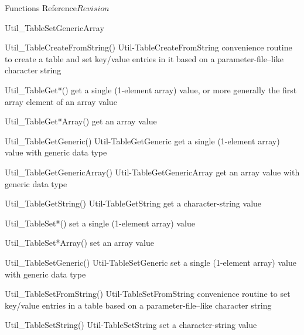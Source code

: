 \begin{cactuspart}{ Functions Reference}{}{$Revision$}
\begin{FunctionDescription}{Util\_TableSetGenericArray}
\begin{SeeAlsoSection}
\begin{SeeAlso2} {Util\_TableCreateFromString()} {Util-TableCreateFromString}
convenience routine to create a table and set key/value entries
in it based on a parameter-file--like character string
\end{SeeAlso2}
\begin{SeeAlso}{Util\_TableGet*()}
get a single (1-element array) value,
or more generally the first array element of an array value
\end{SeeAlso}
\begin{SeeAlso}{Util\_TableGet*Array()}
get an array value
\end{SeeAlso}
\begin{SeeAlso2} {Util\_TableGetGeneric()} {Util-TableGetGeneric}
get a single (1-element array) value with generic data type
\end{SeeAlso2}
\begin{SeeAlso2} {Util\_TableGetGenericArray()} {Util-TableGetGenericArray}
get an array value with generic data type
\end{SeeAlso2}
\begin{SeeAlso2} {Util\_TableGetString()} {Util-TableGetString}
get a character-string value
\end{SeeAlso2}
\begin{SeeAlso}{Util\_TableSet*()}
set a single (1-element array) value
\end{SeeAlso}
\begin{SeeAlso}{Util\_TableSet*Array()}
set an array value
\end{SeeAlso}
\begin{SeeAlso2} {Util\_TableSetGeneric()} {Util-TableSetGeneric}
set a single (1-element array) value with generic data type
\end{SeeAlso2}
\begin{SeeAlso2} {Util\_TableSetFromString()} {Util-TableSetFromString}
convenience routine to set key/value entries in a table based on a
parameter-file--like character string
\end{SeeAlso2}
\begin{SeeAlso2} {Util\_TableSetString()} {Util-TableSetString}
set a character-string value
\end{SeeAlso2}
\end{SeeAlsoSection}


\end{FunctionDescription}
\end{cactuspart}
